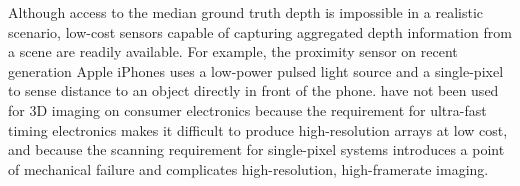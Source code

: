 







Although access to the median ground truth depth is impossible in a realistic
scenario, low-cost sensors capable of capturing aggregated depth information
from a scene are readily available. For example, the proximity sensor on recent
generation Apple iPhones uses a low-power pulsed light source and a
single-pixel  %
to sense distance to an
object directly in front of the phone. %
 have
not been used for 3D imaging on consumer electronics because the requirement for
ultra-fast timing electronics makes it difficult to produce high-resolution
arrays at low cost, and because the scanning requirement for single-pixel
systems introduces a point of mechanical failure and complicates
high-resolution, high-framerate imaging.


